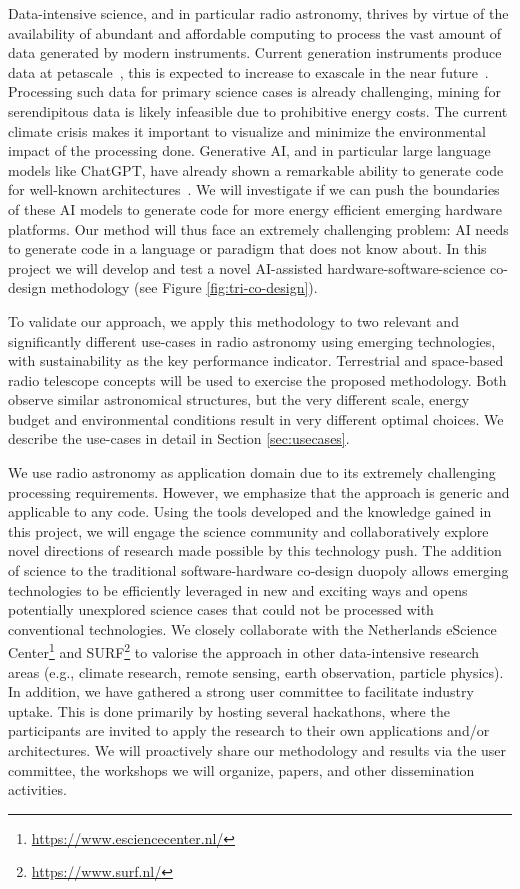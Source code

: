 \documentclass[a4wide,twocolumn]{article}
\begin{document}
Data-intensive science, and in particular radio astronomy, thrives by virtue of the availability of abundant and affordable computing to process the vast amount of data generated by modern instruments. Current generation instruments produce data at petascale~\cite{broekema_cobalt_2018}, this is expected to increase to exascale in the near future~\cite{van2016towards,broekema2012exascale,broekema2012dome,engbersen2014ska}. Processing such data for primary science cases is already challenging, mining for serendipitous data is likely infeasible due to prohibitive energy costs. The current climate crisis makes it important to visualize and minimize the environmental impact of the processing done. Generative AI, and in particular large language models like ChatGPT, have already shown a remarkable ability to generate code for well-known architectures~\cite{godoy_evaluation_2023,nguyen_empirical_2022,barke_grounded_2023,le_coderl_2022}. We will investigate if we can push the boundaries of these AI models to generate code for more energy efficient emerging hardware platforms. Our method will thus face an extremely challenging problem: AI needs to generate code in a language or paradigm that does not know about. In this project we will develop and test a novel AI-assisted hardware-software-science co-design methodology (see Figure \ref{fig:tri-co-design}).

To validate our approach, we apply this methodology to two relevant and significantly different use-cases in radio astronomy using emerging technologies, with sustainability as the key performance indicator. Terrestrial and space-based radio telescope concepts will be used to exercise the proposed methodology. Both observe similar astronomical structures, but the very different scale, energy budget and environmental conditions result in very different optimal choices. We describe the use-cases in detail in Section \ref{sec:usecases}.

We use radio astronomy as application domain due to its extremely challenging processing requirements. However, we emphasize that the approach is generic and applicable to any code. Using the tools developed and the knowledge gained in this project, we will engage the science community and collaboratively explore novel directions of research made possible by this technology push. The addition of science to the traditional software-hardware co-design duopoly allows emerging technologies to be efficiently leveraged in new and exciting ways and opens potentially unexplored science cases that could not be processed with conventional technologies. We closely collaborate with the Netherlands eScience Center\footnote{\url{https://www.esciencecenter.nl/}} and SURF\footnote{\url{https://www.surf.nl/}} to valorise the approach in other data-intensive research areas (e.g., climate research, remote sensing, earth observation, particle physics). In addition, we have gathered a strong user committee to facilitate industry uptake. This is done primarily by hosting several hackathons, where the participants are invited to apply the research to their own applications and/or architectures. We will proactively share our methodology and results via the user committee, the workshops we will organize, papers, and other dissemination activities.
\end{document}
